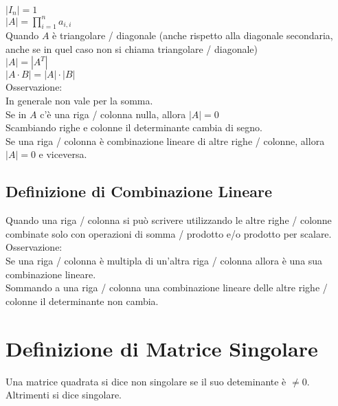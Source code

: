 \documentclass[a4paper, twoside, italian, 11pt]{book}
\begin{document}
$\left | I_n \right | = 1$ \\

\noindent
$\left | A \right | = \prod_{i=1}^n a_{i,i}$ \\

\noindent
Quando $A$ è triangolare / diagonale (anche rispetto alla diagonale secondaria, anche se in quel caso non si chiama triangolare / diagonale) \\

\noindent
$\left | A \right | = \left | A^T \right |$ \\

\noindent
$\left | A \cdot B \right | = \left | A \right | \cdot \left | B \right |$ \\

\noindent
Osservazione: \\
In generale non vale per la somma. \\

\noindent
Se in $A$ c'è una riga / colonna nulla, allora $\left | A \right | = 0$ \\

\noindent
Scambiando righe e colonne %
il determinante cambia di segno. \\

\noindent
Se una riga / colonna è combinazione lineare di altre righe / colonne, allora $\left | A \right | = 0$ e viceversa.


\subsection{Definizione di Combinazione Lineare}

Quando una riga / colonna si può scrivere utilizzando le altre righe / colonne combinate solo con operazioni di somma / prodotto e/o prodotto per scalare. \\

\noindent
Osservazione: \\
Se una riga / colonna è multipla di un'altra riga / colonna allora è una sua combinazione lineare. \\

\noindent
Sommando a una riga / colonna una combinazione lineare delle altre righe / colonne il determinante non cambia. \\



\section{Definizione di Matrice Singolare}
Una matrice quadrata si dice non singolare se il suo deteminante è $\neq 0$. Altrimenti si dice singolare.
\end{document}
